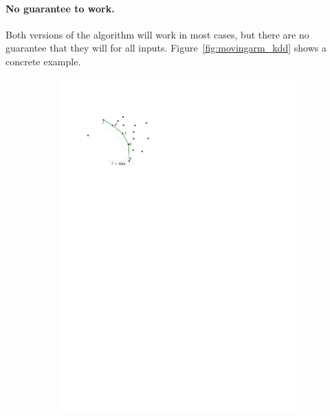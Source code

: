 %

\paragraph{No guarantee to work.} 
Both versions of the algorithm will work in most cases, but there are no guarantee that they will for all inputs.
Figure~\ref{fig:movingarm_kdd} shows a concrete example.
\begin{figure}
  \centering
  \begin{subfigure}[b]{0.3\linewidth}
    \centering
    \includegraphics[page=4,width=\textwidth]{figs/movingarm.pdf}
    \caption{}
  \end{subfigure}
  \qquad
  \begin{subfigure}[b]{0.3\linewidth}
    \centering

\end{subfigure}
\end{figure}
